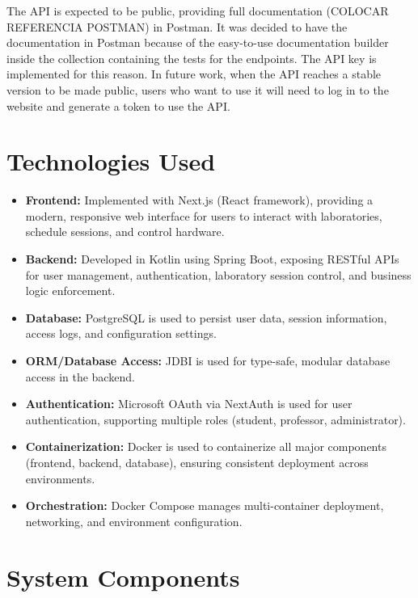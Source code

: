 \vspace{3mm}

The API is expected to be public, providing full documentation (COLOCAR REFERENCIA POSTMAN) in Postman. It was decided to have the documentation in Postman because of the easy-to-use documentation builder inside the collection containing the tests for the endpoints. The API key is implemented for this reason. In future work, when the API reaches a stable version to be made public, users who want to use it will need to log in to the website and generate a token to use the API.





\section{Technologies Used}

\begin{itemize}
    \item \textbf{Frontend:} Implemented with Next.js (React framework), providing a modern, responsive web interface for users to interact with laboratories, schedule sessions, and control hardware.
    \item \textbf{Backend:} Developed in Kotlin using Spring Boot, exposing RESTful APIs for user management, authentication, laboratory session control, and business logic enforcement.
    \item \textbf{Database:} PostgreSQL is used to persist user data, session information, access logs, and configuration settings.
    \item \textbf{ORM/Database Access:} JDBI is used for type-safe, modular database access in the backend.
    \item \textbf{Authentication:} Microsoft OAuth via NextAuth is used for user authentication, supporting multiple roles (student, professor, administrator).
    \item \textbf{Containerization:} Docker is used to containerize all major components (frontend, backend, database), ensuring consistent deployment across environments.
    \item \textbf{Orchestration:} Docker Compose manages multi-container deployment, networking, and environment configuration.
\end{itemize}

\section{System Components}

